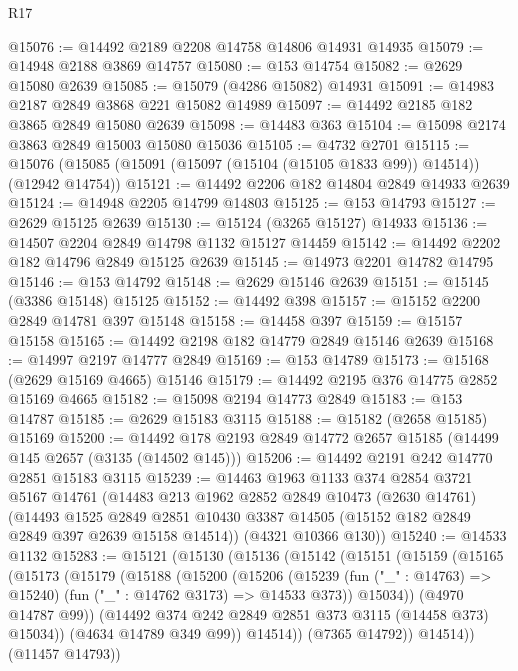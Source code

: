 \begin{lexlean}{R17}
\begin{coremodule}
@15076 := @14492 @2189 @2208 @14758 @14806 @14931 @14935
@15079 := @14948 @2188 @3869 @14757
@15080 := @153 @14754
@15082 := @2629 @15080 @2639
@15085 := @15079 (@4286 @15082) @14931
@15091 := @14983 @2187 @2849 @3868 @221 @15082 @14989
@15097 := @14492 @2185 @182 @3865 @2849 @15080 @2639
@15098 := @14483 @363
@15104 := @15098 @2174 @3863 @2849 @15003 @15080 @15036
@15105 := @4732 @2701
@15115 := @15076 (@15085 (@15091 (@15097 (@15104 (@15105 @1833 @99)) @14514)) (@12942 @14754))
@15121 := @14492 @2206 @182 @14804 @2849 @14933 @2639
@15124 := @14948 @2205 @14799 @14803
@15125 := @153 @14793
@15127 := @2629 @15125 @2639
@15130 := @15124 (@3265 @15127) @14933
@15136 := @14507 @2204 @2849 @14798 @1132 @15127 @14459
@15142 := @14492 @2202 @182 @14796 @2849 @15125 @2639
@15145 := @14973 @2201 @14782 @14795
@15146 := @153 @14792
@15148 := @2629 @15146 @2639
@15151 := @15145 (@3386 @15148) @15125
@15152 := @14492 @398
@15157 := @15152 @2200 @2849 @14781 @397 @15148
@15158 := @14458 @397
@15159 := @15157 @15158
@15165 := @14492 @2198 @182 @14779 @2849 @15146 @2639
@15168 := @14997 @2197 @14777 @2849
@15169 := @153 @14789
@15173 := @15168 (@2629 @15169 @4665) @15146
@15179 := @14492 @2195 @376 @14775 @2852 @15169 @4665
@15182 := @15098 @2194 @14773 @2849
@15183 := @153 @14787
@15185 := @2629 @15183 @3115
@15188 := @15182 (@2658 @15185) @15169
@15200 := @14492 @178 @2193 @2849 @14772 @2657 @15185 (@14499 @145 @2657 (@3135 (@14502 @145)))
@15206 := @14492 @2191 @242 @14770 @2851 @15183 @3115
@15239 := @14463
    @1963
    @1133
    @374
    @2854
    @3721
    @5167
    @14761
    (@14483
      @213
      @1962
      @2852
      @2849
      @10473
      (@2630 @14761)
      (@14493
        @1525
        @2849
        @2851
        @10430
        @3387
        @14505
        (@15152 @182 @2849 @2849 @397 @2639 @15158 @14514))
      (@4321 @10366 @130))
@15240 := @14533 @1132
@15283 := @15121
    (@15130
      (@15136
        (@15142
          (@15151
            (@15159
              (@15165
                (@15173
                  (@15179
                    (@15188
                      (@15200
                        (@15206
                          (@15239
                            (fun ("_" : @14763) => @15240)
                            (fun ("_" : @14762 @3173) => @14533 @373))
                          @15034))
                      (@4970 @14787 @99))
                    (@14492 @374 @242 @2849 @2851 @373 @3115 (@14458 @373) @15034))
                  (@4634 @14789 @349 @99))
                @14514))
            (@7365 @14792))
          @14514))
      (@11457 @14793))

\end{coremodule}
\end{lexlean}
